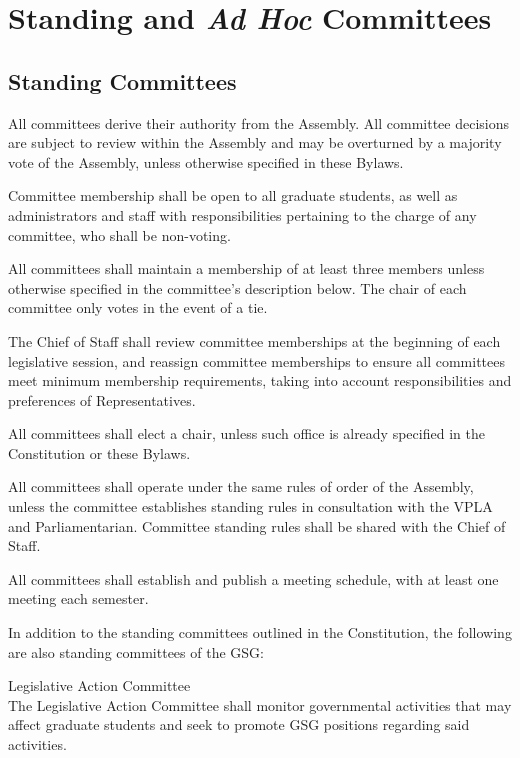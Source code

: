 \chapter{Standing and \textit{Ad Hoc} Committees}

\section{Standing Committees}
\begin{bylaws-number}
  \item All committees derive their authority from the Assembly. All committee decisions are subject to review within the Assembly and may be overturned by a majority vote of the Assembly, unless otherwise specified in these Bylaws.
  \item Committee membership shall be open to all graduate students, as well as administrators and staff with responsibilities pertaining to the charge of any committee, who shall be non-voting.
  \item All committees shall maintain a membership of at least three members unless otherwise specified in the committee’s description below. The chair of each committee only votes in the event of a tie.
  \item The Chief of Staff shall review committee memberships at the beginning of each legislative session, and reassign committee memberships to ensure all committees meet minimum membership requirements, taking into account responsibilities and preferences of Representatives.
  \item All committees shall elect a chair, unless such office is already specified in the Constitution or these Bylaws.
  \item All committees shall operate under the same rules of order of the Assembly, unless the committee establishes standing rules in consultation with the VPLA and Parliamentarian. Committee standing rules shall be shared with the Chief of Staff.
  \item All committees shall establish and publish a meeting schedule, with at least one meeting each semester.
  \item In addition to the standing committees outlined in the Constitution, the following are also standing committees of the GSG:
  \begin{bylaws-number}
    \item Legislative Action Committee \hfill \\
The Legislative Action Committee shall monitor governmental activities that may affect graduate students and seek to promote GSG positions regarding said activities.

\end{bylaws-number}
\end{bylaws-number}
